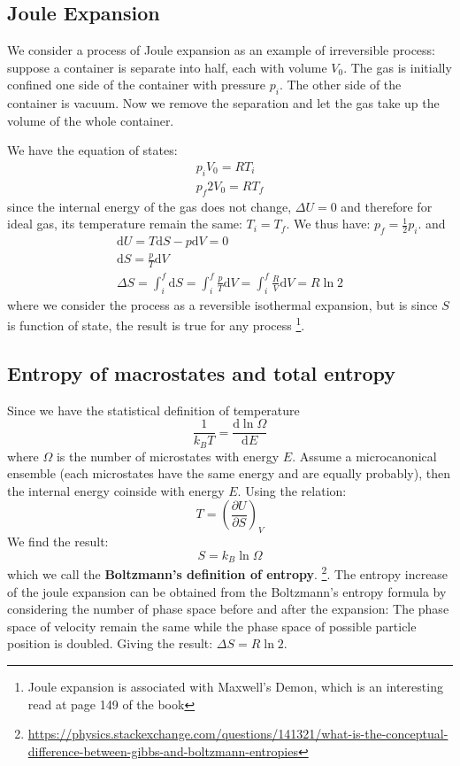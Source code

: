 \documentclass{article}
\newcommand{\pfrac}[2]{\frac{\partial #1}{\partial #2}}
\newcommand{\dnor}{\text{d}}
\begin{document}
\subsection{Joule Expansion}
We consider a process of Joule expansion as an example of irreversible process:
suppose a container is separate into half, each with volume $V_0$. The gas is 
initially confined one side of the container with pressure $p_i$. The other side
of the container is vacuum. Now we remove the separation and let the 
gas take up the volume of the whole container.

We have the equation of states:
\begin{gather}
    p_i V_0 = RT_i \\
    p_f 2V_0 = RT_f
\end{gather}
since the internal energy of the gas does not change, $\Delta U = 0$ and therefore 
for ideal gas, its temperature remain the same: $T_i = T_f$. We thus have:
$p_f = \frac{1}{2} p_i$. and
\begin{gather}
    \dnor U = T \dnor S - p \dnor V = 0 \\
    \dnor S = \frac{p}{T} \dnor V \\ 
    \Delta S = \int_i^f \dnor S = \int_i^f \frac{p}{T} \dnor V = \int_i^f \frac{R}{V} \dnor V = R \ln2
\end{gather}
where we consider the process as a reversible isothermal expansion, but is since $S$ is function
of state, the result is true for any process
\footnote{
Joule expansion is associated with Maxwell's Demon, which is an interesting read at page 149 of the book
}.

\subsection{Entropy of macrostates and total entropy}
Since we have the statistical definition of temperature
\begin{equation}
    \frac{1}{k_BT} = \frac{\dnor \ln\Omega}{\dnor E}
\end{equation}
where $\Omega$ is the number of microstates with energy $E$. 
Assume a microcanonical ensemble (each microstates have the same energy
and are equally probably), then the internal energy coinside 
with energy $E$. Using the relation:
\begin{equation}
    T = \left( \pfrac{U}{S} \right)_V
\end{equation}
We find the result:
\begin{equation}
    S = k_B \ln \Omega
\end{equation}
which we call the \textbf{Boltzmann's definition of entropy}.
\footnote{\url{https://physics.stackexchange.com/questions/141321/what-is-the-conceptual-difference-between-gibbs-and-boltzmann-entropies}}.
The entropy increase of the joule expansion can be obtained from the Boltzmann's entropy formula
by considering the number of phase space before and after the expansion: The phase space of 
velocity remain the same while the phase space of possible particle position is doubled. Giving the 
result: $\Delta S = R \ln2$.
\end{document}
